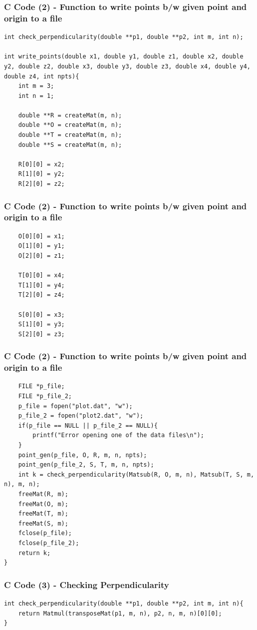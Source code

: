 \documentclass{beamer}
\begin{document}
\begin{frame}[fragile]
    \frametitle{C Code (2) - Function to write points b/w given point and origin to a file}

    \begin{lstlisting}
int check_perpendicularity(double **p1, double **p2, int m, int n);

int write_points(double x1, double y1, double z1, double x2, double y2, double z2, double x3, double y3, double z3, double x4, double y4, double z4, int npts){
    int m = 3;
    int n = 1;

    double **R = createMat(m, n);
    double **O = createMat(m, n);
    double **T = createMat(m, n);
    double **S = createMat(m, n);

    R[0][0] = x2;
    R[1][0] = y2;
    R[2][0] = z2;
    \end{lstlisting}
\end{frame}
\begin{frame}[fragile]
    \frametitle{C Code (2) - Function to write points b/w given point and origin to a file}

    \begin{lstlisting}
    O[0][0] = x1;
    O[1][0] = y1;
    O[2][0] = z1;

    T[0][0] = x4;
    T[1][0] = y4;
    T[2][0] = z4;

    S[0][0] = x3;
    S[1][0] = y3;
    S[2][0] = z3;
    \end{lstlisting}
\end{frame}

\begin{frame}[fragile]
    \frametitle{C Code (2) - Function to write points b/w given point and origin to a file}

    \begin{lstlisting}
    FILE *p_file;
    FILE *p_file_2;
    p_file = fopen("plot.dat", "w");
    p_file_2 = fopen("plot2.dat", "w");
    if(p_file == NULL || p_file_2 == NULL){
        printf("Error opening one of the data files\n");
    }
    point_gen(p_file, O, R, m, n, npts);
    point_gen(p_file_2, S, T, m, n, npts);
    int k = check_perpendicularity(Matsub(R, O, m, n), Matsub(T, S, m, n), m, n);
    freeMat(R, m);
    freeMat(O, m);
    freeMat(T, m);
    freeMat(S, m);
    fclose(p_file);
    fclose(p_file_2);
    return k;
}
    \end{lstlisting}
\end{frame}


\begin{frame}[fragile]
    \frametitle{C Code (3) - Checking Perpendicularity}

\begin{lstlisting}
int check_perpendicularity(double **p1, double **p2, int m, int n){
    return Matmul(transposeMat(p1, m, n), p2, n, m, n)[0][0];
}
\end{lstlisting}
\end{frame}
\end{document}
